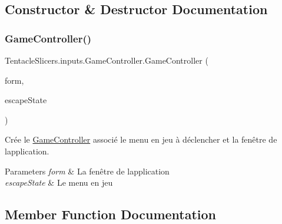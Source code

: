 \subsection{Constructor \& Destructor Documentation}
\mbox{\label{class_tentacle_slicers_1_1inputs_1_1_game_controller_a7f6f576b5e9dbeb6ffabd2871f4bda49}} 
\subsubsection{\texorpdfstring{Game\+Controller()}{GameController()}}
{\footnotesize\ttfamily Tentacle\+Slicers.\+inputs.\+Game\+Controller.\+Game\+Controller (\begin{DoxyParamCaption}\item[{\hyperlink{class_tentacle_slicers_1_1windows_1_1_main_form}{Main\+Form}}]{form,  }\item[{\hyperlink{class_tentacle_slicers_1_1windows_1_1_windows_state}{Windows\+State}}]{escape\+State }\end{DoxyParamCaption})}



Crée le \hyperlink{class_tentacle_slicers_1_1inputs_1_1_game_controller}{Game\+Controller} associé le menu en jeu à déclencher et la fenêtre de l\textquotesingle{}application. 


\begin{DoxyParams}{Parameters}
{\em form} & La fenêtre de l\textquotesingle{}application \\
\hline
{\em escape\+State} & Le menu en jeu \\
\hline
\end{DoxyParams}


\subsection{Member Function Documentation}
\mbox{\label{class_tentacle_slicers_1_1inputs_1_1_game_controller_ad2c4462255e76a592937943b437b865a}} 
